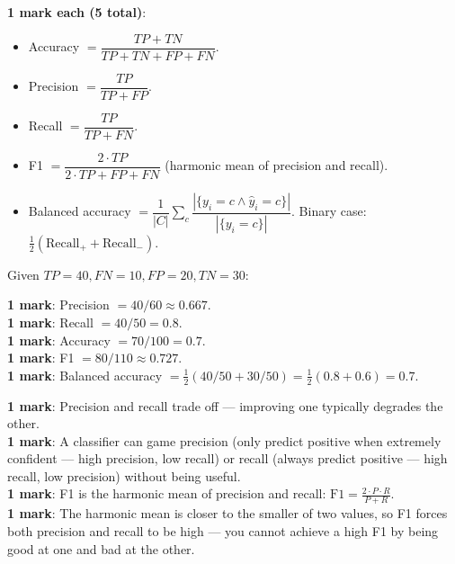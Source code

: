 \documentclass[11pt, a4paper]{article}
\begin{document}
\begin{exambox}
\textbf{1 mark each (5 total)}:
\begin{itemize}
  \item Accuracy $= \dfrac{TP + TN}{TP + TN + FP + FN}$.
  \item Precision $= \dfrac{TP}{TP + FP}$.
  \item Recall $= \dfrac{TP}{TP + FN}$.
  \item F1 $= \dfrac{2 \cdot TP}{2 \cdot TP + FP + FN}$ (harmonic mean of precision and recall).
  \item Balanced accuracy $= \dfrac{1}{|C|}\sum_c \dfrac{|\{y_i = c \wedge \hat y_i = c\}|}{|\{y_i = c\}|}$. Binary case: $\tfrac{1}{2}(\text{Recall}_+ + \text{Recall}_-)$.
\end{itemize}
\end{exambox}

\begin{exambox}
Given $TP=40, FN=10, FP=20, TN=30$:

\textbf{1 mark}: Precision $= 40/60 \approx 0.667$. \\
\textbf{1 mark}: Recall $= 40/50 = 0.8$. \\
\textbf{1 mark}: Accuracy $= 70/100 = 0.7$. \\
\textbf{1 mark}: F1 $= 80/110 \approx 0.727$. \\
\textbf{1 mark}: Balanced accuracy $= \tfrac{1}{2}(40/50 + 30/50) = \tfrac{1}{2}(0.8 + 0.6) = 0.7$.
\end{exambox}

\begin{exambox}
\textbf{1 mark}: Precision and recall trade off — improving one typically degrades the other. \\
\textbf{1 mark}: A classifier can game precision (only predict positive when extremely confident — high precision, low recall) or recall (always predict positive — high recall, low precision) without being useful. \\
\textbf{1 mark}: F1 is the harmonic mean of precision and recall: $\text{F1} = \tfrac{2 \cdot P \cdot R}{P + R}$. \\
\textbf{1 mark}: The harmonic mean is closer to the smaller of two values, so F1 forces both precision and recall to be high — you cannot achieve a high F1 by being good at one and bad at the other.
\end{exambox}
\end{document}
